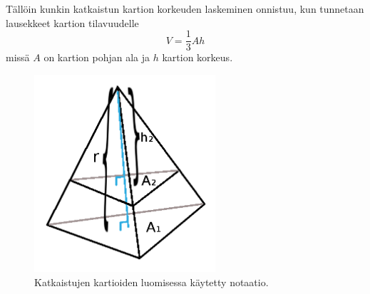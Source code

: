 \documentclass[12pt,a4paper,titlepage]{article}
\begin{document}
Tällöin kunkin katkaistun kartion korkeuden laskeminen onnistuu, kun tunnetaan lausekkeet kartion tilavuudelle
\begin{equation}\label{kartiontilavuus}
	V=\frac{1}{3}Ah
\end{equation}
missä $A$ on kartion pohjan ala ja $h$ kartion korkeus.
%
%
%
\begin{figure}
  \centering
  \includegraphics[width=0.6\textwidth]{kuvat/skaalaus.png}
  \caption{Katkaistujen kartioiden luomisessa käytetty notaatio.}
  \label{skaalaus}
\end{figure}
\end{document}
